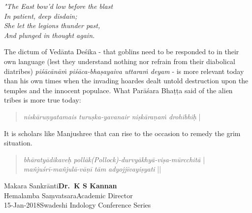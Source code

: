 \smallskip

\begin{myquote}
{{\sl "The East bow'd low before the blast}}\\
{\sl In patient, deep disdain;}\\
{\sl She let the legions thunder past,}\\
{\sl And plunged in thought again.}
\end{myquote}

The dictum of Vedānta Deśika - that goblins need to be responded to in their own language (lest they understand nothing nor refrain from their diabolical diatribes) {\sl piśācānāṁ piśāca-bhaṣayaiva uttaraṁ deyam} - is more relevant today than his own times when the invading hoardes dealt untold destruction upon the temples and the innocent populace. What Parāśara Bhaṭṭa said of the alien tribes is more true today:
\begin{quote}
{{\sl niskāruṇyatamais turuṣka-yavanair niṣkāraṇaṁ drohibhiḥ}} |
\end{quote}

It is scholars like Manjushree that can rise to the occasion to remedy the grim situation.
\begin{quote}
{{\sl bhāratyādikaveḥ pollāk(Pollock)-durvyākhyā-viṣa-mūrcchitā}} |\\
{\sl mañjuśrī-mañjulā-vāṇī tām adyojjīvayiṣyati} ||
\end{quote}

\bigskip

\noindent
Makara Sankrānti\hfill	{\bf Dr.~K S Kannan}\\
Hemalamba Saṃvatsara\hfill Academic Director\\
15-Jan-2018\hfill Swadeshi Indology Conference Series

